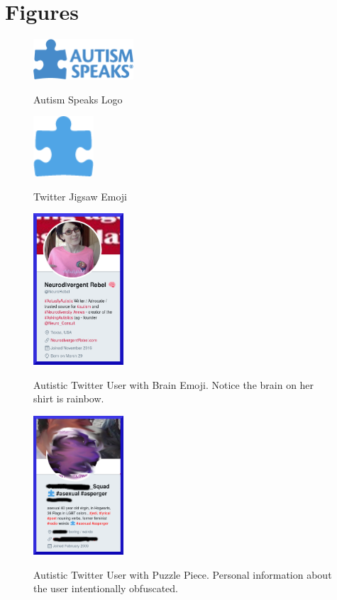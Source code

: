 \section{Figures}
\label{apx:figures}

\begin{figure}[ht]
\caption{Autism Speaks Logo}
\centering
\includegraphics[width=0.333\textwidth]{aspeaks}
\label{fig:aspeaks}
\end{figure}

\begin{figure}[ht]
\caption{Twitter Jigsaw Emoji}
\centering
\includegraphics[width=0.2\textwidth]{twitterJigsaw}
\label{fig:twitterJigsaw}
\end{figure}

\begin{figure}[ht]
\caption{Autistic Twitter User with Brain Emoji. Notice the brain on her shirt is rainbow.}
\centering
\includegraphics[width=0.3\textwidth]{rebel.png}
\label{fig:rebel}
\end{figure}

\begin{figure}[ht]
\caption{Autistic Twitter User with Puzzle Piece. Personal information about the user intentionally obfuscated.}
\centering
\includegraphics[width=0.3\textwidth]{covfefe.png}
\label{fig:covfefe}
\end{figure}

